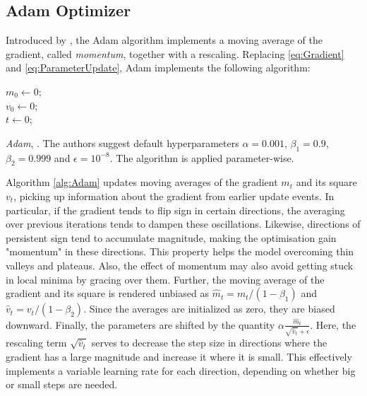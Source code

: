\subsection{Adam Optimizer}\label{sec:AdamOptimizer}
Introduced by \citet{kingma2017adam}, the Adam algorithm implements a moving average of the gradient, called \emph{momentum}, together with a rescaling. Replacing \autoref{eq:Gradient} and \autoref{eq:ParameterUpdate}, Adam implements the following algorithm:

\begin{algorithm}[H]\label{alg:Adam}
\SetAlgoLined

$m_0 \gets 0$;\\
$v_0 \gets 0$;\\
$t \gets 0$;\\
\caption{\emph{Adam}, \cite{kingma2017adam}. The authors suggest default hyperparameters $\alpha = 0.001$, $\beta_1 = 0.9$, $\beta_2 = 0.999$ and $\epsilon = 10^{-8}$. The algorithm is applied parameter-wise.}
\end{algorithm}

Algorithm \autoref{alg:Adam} updates moving averages of the gradient $m_t$ and its square $v_t$, picking up information about the gradient from earlier update events. In particular, if the gradient tends to flip sign in certain directions, the averaging over previous iterations tends to dampen these oscillations. Likewise, directions of persistent sign tend to accumulate magnitude, making the optimisation gain "momentum" in these directions. This property helps the model overcoming thin valleys and plateaus. Also, the effect of momentum may also avoid getting stuck in local minima by gracing over them. Further, the moving average of the gradient and its square is rendered unbiased as $\hat{m}_t = m_t/(1-\beta_1)$ and $\hat{v}_t = v_t/(1-\beta_2)$. Since the averages are initialized as zero, they are biased downward. Finally, the parameters are shifted by the quantity $\alpha \frac{\hat{m}_t}{\sqrt{\hat{v}_t} + \epsilon}$. Here, the rescaling term $\sqrt{\hat{v}_t}$ serves to decrease the step size in directions where the gradient has a large magnitude and increase it where it is small. This effectively implements a variable learning rate for each direction, depending on whether big or small steps are needed. 

